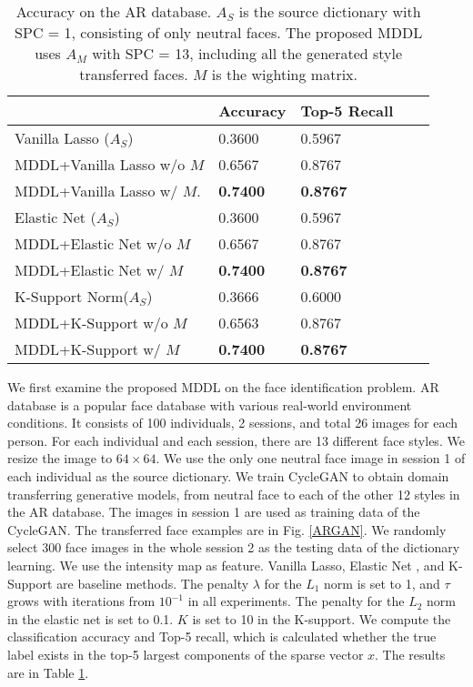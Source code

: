 \documentclass{article}
\begin{document}
\begin{table}[!htb]
\caption{Accuracy on the AR database. $A_S$ is the source dictionary with SPC = 1, consisting of only neutral faces. The proposed MDDL uses $A_M$ with SPC = 13, including all the generated style transferred faces. $M$ is the wighting matrix.}
\label{Table1}
\begin{center}
\begin{tabular}{|l|l|l|l|l|}
\hline
                              & Accuracy & Top-5 Recall        \\ \hline
Vanilla Lasso ($A_S$)         & 0.3600   & 0.5967              \\ \hline
MDDL+Vanilla Lasso w/o $M$    & 0.6567   & 0.8767              \\ \hline
MDDL+Vanilla Lasso w/ $M$.     & \bf{0.7400}   & \bf{0.8767}    \\ \hline
Elastic Net ($A_S$)           & 0.3600   & 0.5967              \\ \hline
MDDL+Elastic Net w/o $M$      & 0.6567   & 0.8767              \\ \hline
MDDL+Elastic Net w/ $M$        & \bf{0.7400}   & \bf{0.8767}    \\ \hline
K-Support Norm($A_S$)         & 0.3666    & 0.6000             \\ \hline
MDDL+K-Support w/o $M$        & 0.6563   & 0.8767              \\ \hline
MDDL+K-Support w/ $M$          & \bf{0.7400}   & \bf{0.8767}         \\ \hline 
\end{tabular}
\end{center}
\end{table}

We first examine the proposed MDDL on the face identification problem. AR database \cite{mart2001pami} is a popular face database with various real-world environment conditions. It consists of 100 individuals, 2 sessions, and total 26 images for each person. For each individual and each session, there are 13 different face styles. We resize the image to $64\times 64$. We use the only one neutral face image in session 1 of each individual as the source dictionary. We train CycleGAN \cite{zhu2017unpaired} to obtain domain transferring generative models, from neutral face to each of the other 12 styles in the AR database. The images in session 1 are used as training data of the CycleGAN. The transferred face examples are in Fig. \ref{ARGAN}. We randomly select 300 face images in the whole session 2 as the testing data of the dictionary learning. We use the intensity map as feature. Vanilla Lasso, Elastic Net \cite{zou2005regularization}, and K-Support \cite{lai2014efficient} are baseline methods. The penalty $\lambda$ for the $L_1$ norm is set to 1, and $\tau$ grows with iterations from $10^{-1}$ in all experiments. The penalty for the $L_2$ norm in the elastic net is set to 0.1. $K$ is set to 10 in the K-support. We compute the classification accuracy and Top-5 recall, which is calculated whether the true label exists in the top-5 largest components of the sparse vector $x$. The results are in Table \ref{Table1}.
\end{document}
